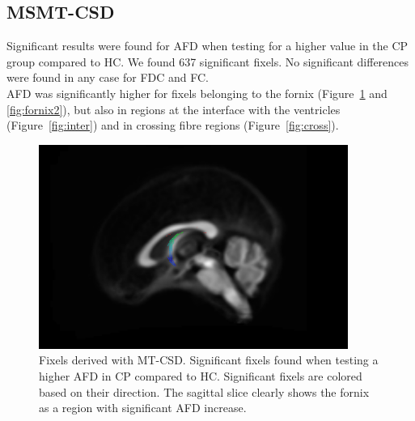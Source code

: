 \subsection{MSMT-CSD}
Significant results were found for AFD when testing for a higher value in the CP group compared to HC. We found 637 significant fixels. No significant differences were found in any case for FDC and FC. 
\\AFD was significantly higher for fixels belonging to the fornix (Figure~\ref{fig:fornix1} and \ref{fig:fornix2}), but also in regions at the interface with the ventricles (Figure~\ref{fig:inter}) and in crossing fibre regions (Figure~\ref{fig:cross}).

\begin{figure}[h]
  \centering
  \includegraphics[width=0.9\textwidth]{Images/fornix1.jpg} %
  \caption{Fixels derived with MT-CSD. Significant fixels found when testing a higher AFD in CP compared to HC. Significant fixels are colored based on their direction. The sagittal slice clearly shows the fornix as a region with significant AFD increase.}
  \label{fig:fornix1}
\end{figure}

